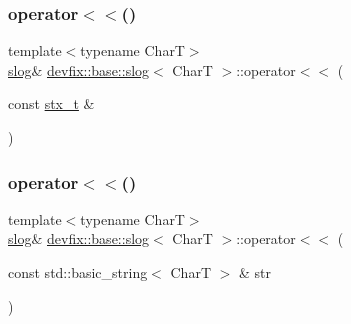 \mbox{\label{structdevfix_1_1base_1_1slog_aeb652e46530be0f44e33f88e17c5b8aa}} 
\subsubsection{\texorpdfstring{operator$<$$<$()}{operator<<()}\hspace{0.1cm}{\footnotesize\ttfamily [1/3]}}
{\footnotesize\ttfamily template$<$typename CharT$>$ \\
\hyperlink{structdevfix_1_1base_1_1slog}{slog}\& \hyperlink{structdevfix_1_1base_1_1slog}{devfix\+::base\+::slog}$<$ CharT $>$\+::operator$<$$<$ (\begin{DoxyParamCaption}\item[{const \hyperlink{structdevfix_1_1base_1_1stx__t}{stx\+\_\+t} \&}]{ }\end{DoxyParamCaption})\hspace{0.3cm}{\ttfamily [inline]}}

\mbox{\label{structdevfix_1_1base_1_1slog_ae29889ec05f8930826cdf5ec1947a8d1}} 
\subsubsection{\texorpdfstring{operator$<$$<$()}{operator<<()}\hspace{0.1cm}{\footnotesize\ttfamily [2/3]}}
{\footnotesize\ttfamily template$<$typename CharT$>$ \\
\hyperlink{structdevfix_1_1base_1_1slog}{slog}\& \hyperlink{structdevfix_1_1base_1_1slog}{devfix\+::base\+::slog}$<$ CharT $>$\+::operator$<$$<$ (\begin{DoxyParamCaption}\item[{const std\+::basic\+\_\+string$<$ CharT $>$ \&}]{str }\end{DoxyParamCaption})\hspace{0.3cm}{\ttfamily [inline]}}

\mbox{\label{structdevfix_1_1base_1_1slog_a856573b0121225a0bd80c0f02645227c}} 
